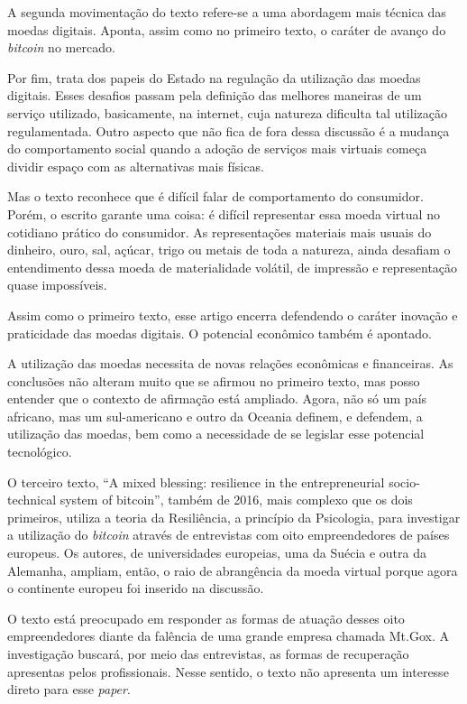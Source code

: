 \documentclass[12pt]{article}
\begin{document}
A segunda movimentação do texto refere-se a uma abordagem mais técnica das moedas digitais. Aponta, assim como no primeiro texto, o caráter de avanço do \textit{bitcoin} no mercado.

Por fim, trata dos papeis do Estado na regulação da utilização das moedas digitais. Esses desafios passam pela definição das melhores maneiras de um serviço utilizado, basicamente, na internet, cuja natureza dificulta tal utilização regulamentada. Outro aspecto que não fica de fora dessa discussão é a mudança do comportamento social quando a adoção de serviços mais virtuais começa dividir espaço com as alternativas mais físicas.

Mas o texto reconhece que é difícil falar de comportamento do consumidor. Porém, o escrito garante uma coisa: é difícil representar essa moeda virtual no cotidiano prático do consumidor. As representações materiais mais usuais do dinheiro, ouro, sal, açúcar, trigo ou metais de toda a natureza, ainda desafiam o entendimento dessa moeda de materialidade volátil, de impressão e representação quase impossíveis.

Assim como o primeiro texto, esse artigo encerra defendendo o caráter inovação e praticidade das moedas digitais. O potencial econômico também é apontado.

A utilização das moedas necessita de novas relações econômicas e financeiras. As conclusões não alteram muito que se afirmou no primeiro texto, mas posso entender que o contexto de afirmação está ampliado. Agora, não só um país africano, mas um sul-americano e outro da Oceania definem, e defendem, a utilização das moedas, bem como a necessidade de se legislar esse potencial tecnológico.

O terceiro texto, “A mixed blessing: resilience in the entrepreneurial socio-technical system of bitcoin”, também de 2016, mais complexo que os dois primeiros, utiliza a teoria da Resiliência, a princípio da Psicologia, para investigar a utilização do \textit{bitcoin} através de entrevistas com oito empreendedores de países europeus. Os autores, de universidades europeias, uma da Suécia e outra da Alemanha, ampliam, então, o raio de abrangência da moeda virtual porque agora o continente europeu foi inserido na discussão.

O texto está preocupado em responder as formas de atuação desses oito empreendedores diante da falência de uma grande empresa chamada Mt.Gox. A investigação buscará, por meio das entrevistas, as formas de recuperação apresentas pelos profissionais. Nesse sentido, o texto não apresenta um interesse direto para esse \textit{paper}.
\end{document}
